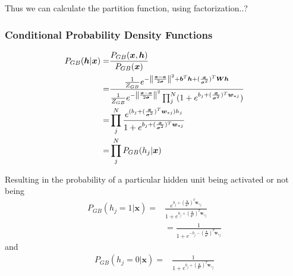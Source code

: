 \documentclass[twoside,english]{uiofysmaster}
\DeclarePairedDelimiter{\norm}{\lVert}{\rVert}
\begin{document}
Thus we can calculate the partition function, using factorization..?

\subsubsection{Conditional Probability Density Functions}
\begin{align}
	P_{GB} (\bm{h}| \bm{x}) =& \frac{P_{GB} (\bm{x}, \bm{h})}{P_{GB} (\bm{x})} \nonumber \\
	=& \frac{\frac{1}{Z_{GB}} e^{-\norm*{\frac{\bm{x} -\bm{a}}{2\bm{\sigma}}}^2 + \bm{b}^T \bm{h} 
	+ (\frac{\bm{x}}{\bm{\sigma}^2})^T \bm{W}\bm{h}}}
	{\frac{1}{Z_{GB}} e^{-\norm*{\frac{\bm{x} -\bm{a}}{2\bm{\sigma}}}^2}
	\prod_j^N (1 + e^{b_j + (\frac{\bm{x}}{\bm{\sigma}^2})^T \bm{w}_{\ast j}} ) }
	\nonumber \\
	=& \prod_j^N \frac{e^{(b_j + (\frac{\bm{x}}{\bm{\sigma}^2})^T \bm{w}_{\ast j})h_j } }
	{1 + e^{b_j + (\frac{\bm{x}}{\bm{\sigma}^2})^T \bm{w}_{\ast j}}} \nonumber \\
	=& \prod_j^N P_{GB} (h_j|\bm{x})
\end{align}

Resulting in the probability of a particular hidden unit being activated or not being
\begin{align}
	P_{GB} (h_j =1 | \bm{x}) =& \frac{e^{b_j + (\frac{\bm{x}}{\bm{\sigma}^2})^T \bm{w}_{\ast j} } }
	{1 + e^{b_j + (\frac{\bm{x}}{\bm{\sigma}^2})^T \bm{w}_{\ast j}}} \nonumber \\
	&= \frac{1}{1 + e^{-b_j - (\frac{\bm{x}}{\bm{\sigma}^2})^T \bm{w}_{\ast j}}}
\end{align}
and
\begin{align}
	P_{GB} (h_j =0 | \bm{x}) =&
	\frac{1}{1 + e^{b_j +(\frac{\bm{x}}{\bm{\sigma}^2})^T \bm{w}_{\ast j}}}
\end{align}
\end{document}
